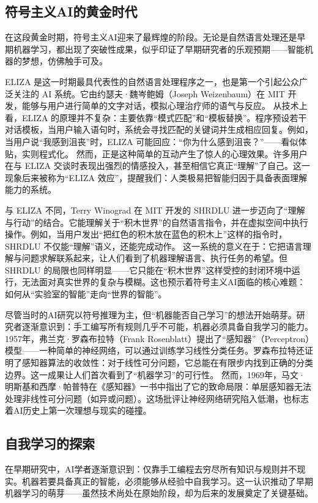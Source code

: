 \subsection{符号主义AI的黄金时代}

在这段黄金时期，符号主义AI迎来了最辉煌的阶段。无论是自然语言处理还是早期机器学习，都出现了突破性成果，似乎印证了早期研究者的乐观预期——智能机器的梦想，仿佛触手可及。

ELIZA 是这一时期最具代表性的自然语言处理程序之一，也是第一个引起公众广泛关注的 AI 系统。它由约瑟夫·魏岑鲍姆（Joseph Weizenbaum）在 MIT 开发，能够与用户进行简单的文字对话，模拟心理治疗师的语气与反应。  
从技术上看，ELIZA 的原理并不复杂：主要依靠“模式匹配”和“模板替换”。程序预设若干对话模板，当用户输入语句时，系统会寻找匹配的关键词并生成相应回复。例如，当用户说“我感到沮丧”时，ELIZA 可能回应：“你为什么感到沮丧？”——看似体贴，实则程式化。  
然而，正是这种简单的互动产生了惊人的心理效果。许多用户在与 ELIZA 交谈时表现出强烈的情感投入，甚至相信它真正“理解”了自己。这一现象后来被称为“ELIZA 效应”，提醒我们：人类极易把智能归因于具备表面理解能力的系统。

与 ELIZA 不同，Terry Winograd 在 MIT 开发的 SHRDLU 进一步迈向了“理解与行动”的结合。它能理解关于“积木世界”的自然语言指令，并在虚拟空间中执行操作。例如，当用户发出“把红色的积木放在蓝色的积木上”这样的指令时，SHRDLU 不仅能“理解”语义，还能完成动作。  
这一系统的意义在于：它把语言理解与问题求解联系起来，让人们看到了机器理解语言、执行任务的希望。但 SHRDLU 的局限也同样明显——它只能在“积木世界”这样受控的封闭环境中运行，无法面对真实世界的复杂与模糊。这也预示着符号主义AI面临的核心难题：如何从“实验室的智能”走向“世界的智能”。

尽管当时的AI研究以符号推理为主，但“机器能否自己学习”的想法开始萌芽。研究者逐渐意识到：手工编写所有规则几乎不可能，机器必须具备自我学习的能力。  
1957年，弗兰克·罗森布拉特（Frank Rosenblatt）提出了“感知器”（Perceptron）模型——一种简单的神经网络，可以通过训练学习线性分类任务。罗森布拉特还证明了感知器算法的收敛性：对于线性可分问题，它总能在有限步内找到正确的分类边界。这一成果让人们首次看到了“机器学习”的可行性。  
然而，1969年，马文·明斯基和西摩·帕普特在《感知器》一书中指出了它的致命局限：单层感知器无法处理非线性可分问题（如异或问题）。这场批评让神经网络研究陷入低潮，也标志着AI历史上第一次理想与现实的碰撞。

\subsection{自我学习的探索}

在早期研究中，AI学者逐渐意识到：仅靠手工编程去穷尽所有知识与规则并不现实。机器若要具备真正的智能，必须能够从经验中自我学习。这一认识推动了早期机器学习的萌芽——虽然技术尚处在原始阶段，却为后来的发展奠定了关键基础。

